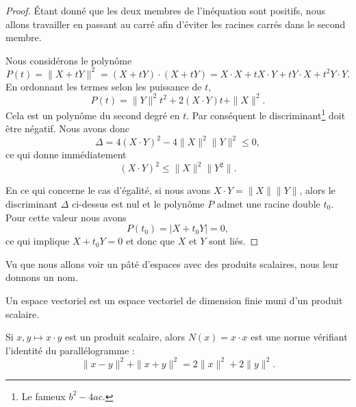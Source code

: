 \begin{proof}
	Étant donné que les deux membres de l'inéquation sont positifs, nous allons travailler en passant au carré afin d'éviter les racines carrés dans le second membre.

	Nous considérons le polynôme
	\begin{equation}
		P(t)=\| X+tY \|^2=(X+tY)\cdot(X+tY)=X\cdot X+tX\cdot Y+tY\cdot X+t^2Y\cdot Y.
	\end{equation}
	En ordonnant les termes selon les puissance de $t$,
	\begin{equation}
		P(t)=\| Y \|^2t^2+2(X\cdot Y)t+\| X \|^2.
	\end{equation}
	Cela est un polynôme du second degré en $t$. Par conséquent le discriminant\footnote{Le fameux $b^2-4ac$.} doit être négatif. Nous avons donc
	\begin{equation}
		\Delta=4(X\cdot Y)^2-4\| X \|^2\| Y \|^2\leq 0,
	\end{equation}
	ce qui donne immédiatement
	\begin{equation}
		(X\cdot Y)^2\leq\| X \|^2\| Y^2 \|.
	\end{equation}

    En ce qui concerne le cas d'égalité, si nous avons \( X\cdot Y=\| X \|\| Y \|\), alors le discriminant \( \Delta\) ci-dessus est nul et le polynôme \( P\) admet une racine double \( t_0\). Pour cette valeur nous avons
    \begin{equation}
        P(t_0)=| X+t_0Y |=0,
    \end{equation}
    ce qui implique \( X+t_0Y=0\) et donc que \( X\) et \( Y\) sont liés.
\end{proof}

Vu que nous allons voir un pâté d'espaces avec des produits scalaires, nous leur donnons un nom.
\begin{definition}\label{DefLZMcvfj}
    Un espace vectoriel  est un espace vectoriel de dimension finie muni d'un produit scalaire.
\end{definition}

\begin{proposition}
    Si \( x,y\mapsto x\cdot y\) est un produit scalaire, alors \( N(x)=x\cdot x\) est une norme vérifiant l'identité du parallélogramme :
    \begin{equation}        \label{EqYCLtWfJ}
        \| x-y \|^2+\| x+y \|^2=2\| x \|^2+2\| y \|^2.
    \end{equation}
\end{proposition}

